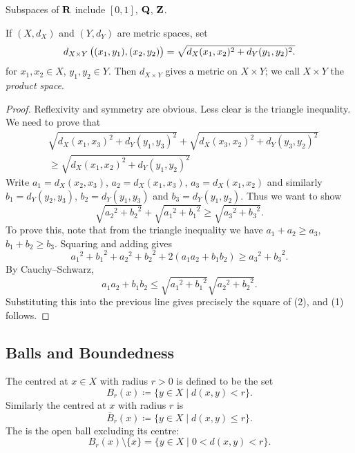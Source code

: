 \begin{example}
Subspaces of $\mathbf R$ include $[0,1]$, $\mathbf Q$, $\mathbf Z$.
\end{example}

\begin{proposition}
If $(X,d_X)$ and $(Y,d_Y)$ are metric spaces, set
\[d_{X\times Y}\left((x_1,y_1),(x_2,y_2)\right)=\sqrt{d_X(x_1,x_2)^2+d_Y(y_1,y_2)^2.}\]
for $x_1,x_2\in X$, $y_1,y_2\in Y$. Then $d_{X\times Y}$ gives a metric on $X\times Y$; we call $X\times Y$ the \emph{product space}.
\end{proposition}

\begin{proof}
Reflexivity and symmetry are obvious. Less clear is the triangle inequality. We need to prove that
\begin{equation*}\tag{1}
\begin{split}
&\sqrt{d_X(x_1,x_3)^2+d_Y(y_1,y_3)^2}+\sqrt{d_X(x_3,x_2)^2+d_Y(y_3,y_2)^2}\\
&\ge\sqrt{d_X(x_1,x_2)^2+d_Y(y_1,y_2)^2}
\end{split}
\end{equation*}
Write $a_1=d_X(x_2,x_3)$, $a_2=d_X(x_1,x_3)$, $a_3=d_X(x_1,x_2)$ and similarly $b_1=d_Y(y_2,y_3)$, $b_2=d_Y(y_1,y_3)$ and $b_3=d_Y(y_1,y_2)$. Thus we want to show
\begin{equation*}\tag{2}
\sqrt{{a_2}^2+{b_2}^2}+\sqrt{{a_1}^2+{b_1}^2}\ge\sqrt{{a_3}^2+{b_3}^2}.
\end{equation*}
To prove this, note that from the triangle inequality we have $a_1+a_2\ge a_3$, $b_1+b_2\ge b_3$. Squaring and adding gives
\[{a_1}^2+{b_1}^2+{a_2}^2+{b_2}^2+2(a_1a_2+b_1b_2)\ge {a_3}^2+{b_3}^2.\]
By Cauchy--Schwarz,
\[a_1a_2+b_1b_2\le\sqrt{{a_1}^2+{b_1}^2}\sqrt{{a_2}^2+{b_2}^2}.\]
Substituting this into the previous line gives precisely the square of (2), and (1) follows.
\end{proof}

\subsection{Balls and Boundedness}
\begin{definition}[Balls]
The  centred at $x\in X$ with radius $r>0$ is defined to be the set
\[B_r(x)\coloneqq\{y\in X\mid d(x,y)<r\}.\]
Similarly the  centred at $x$ with radius $r$ is
\[\overline{B}_r(x)\coloneqq\{y\in X\mid d(x,y)\le r\}.\]
The  is the open ball excluding its centre:
\[B_r(x)\setminus\{x\}=\{y\in X\mid 0<d(x,y)<r\}.\]
\end{definition}

